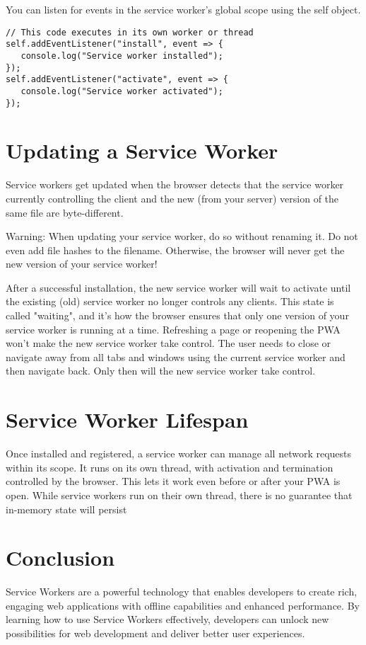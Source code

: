 \documentclass{article}
\begin{document}
You can listen for events in the service worker's global scope using the self object.

\begin{verbatim}
// This code executes in its own worker or thread
self.addEventListener("install", event => {
   console.log("Service worker installed");
});
self.addEventListener("activate", event => {
   console.log("Service worker activated");
});
\end{verbatim}

\section*{Updating a Service Worker}

Service workers get updated when the browser detects that the service worker currently controlling the client and the new (from your server) version of the same file are byte-different.

Warning: When updating your service worker, do so without renaming it. Do not even add file hashes to the filename. Otherwise, the browser will never get the new version of your service worker!

After a successful installation, the new service worker will wait to activate until the existing (old) service worker no longer controls any clients. This state is called "waiting", and it's how the browser ensures that only one version of your service worker is running at a time. Refreshing a page or reopening the PWA won't make the new service worker take control. The user needs to close or navigate away from all tabs and windows using the current service worker and then navigate back. Only then will the new service worker take control.

\section*{Service Worker Lifespan}

Once installed and registered, a service worker can manage all network requests within its scope. It runs on its own thread, with activation and termination controlled by the browser. This lets it work even before or after your PWA is open. While service workers run on their own thread, there is no guarantee that in-memory state will persist




\section*{Conclusion}

Service Workers are a powerful technology that enables developers to create rich, engaging web applications with offline capabilities and enhanced performance. By learning how to use Service Workers effectively, developers can unlock new possibilities for web development and deliver better user experiences.

\pagebreak

\citep{webdev,mdnsw}
 
    
\end{document}
